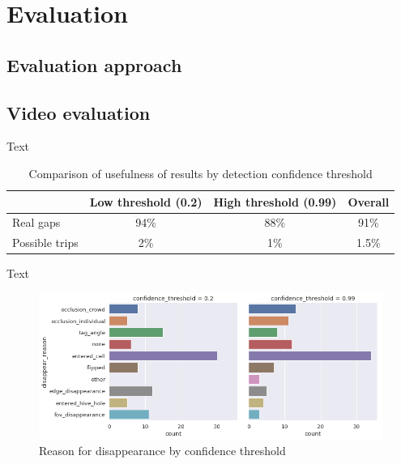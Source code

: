
\chapter{Evaluation}  %

\ifpdf
    \graphicspath{{Chapters/Chapter4/Figs/Raster/}{Chapters/Chapter4/Figs/PDF/}{Chapters/Chapter4/Figs/}}
\else
    \graphicspath{{Chapters/Chapter4/Figs/Vector/}{Chapters/Chapter4/Figs/}}
\fi


\section{Evaluation approach}



\section{Video evaluation}

Text

\begin{table}[]
    \caption{Comparison of usefulness of results by detection confidence threshold}
    \centering
    \label{table:conf_comparison}
    \begin{tabular}{@{}lccc@{}}
        \toprule
                       & Low threshold (0.2) & High threshold (0.99) & Overall \\ \midrule
        Real gaps      & 94\%                & 88\%                  & 91\%    \\
        Possible trips & 2\%                 & 1\%                   & 1.5\%  
    \end{tabular}
\end{table}

Text 

\begin{figure}[htbp!] 
\centering    
\includegraphics[width=1.0\textwidth]{gap_reason_dist}
\caption[gap_reason_dist]{Reason for disappearance by confidence threshold}
\label{fig:gap_reason_dist}
\end{figure}